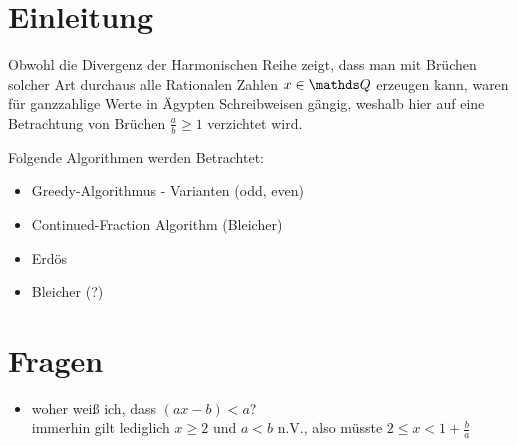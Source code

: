 \section{Einleitung}

Obwohl die Divergenz der Harmonischen Reihe zeigt, dass man mit Brüchen solcher Art durchaus alle Rationalen Zahlen $x \in \Q$ erzeugen kann, waren für ganzzahlige Werte in Ägypten Schreibweisen gängig, weshalb hier auf eine Betrachtung von Brüchen $\frac{a}{b} \geq 1$ verzichtet wird.

Folgende Algorithmen werden Betrachtet:
\begin{itemize}
	\item Greedy-Algorithmus 
		\subitem - Varianten (odd, even)
	\item Continued-Fraction Algorithm (Bleicher)
	\item Erdös
	\item Bleicher (?)
\end{itemize}

\section*{Fragen}
\begin{itemize}
	\item woher weiß ich, dass $(ax-b)<a$?\\ immerhin gilt lediglich $x \geq 2$ und $a<b$ n.V., also müsste $2 \leq x < 1+\frac{b}{a}$
\end{itemize}
